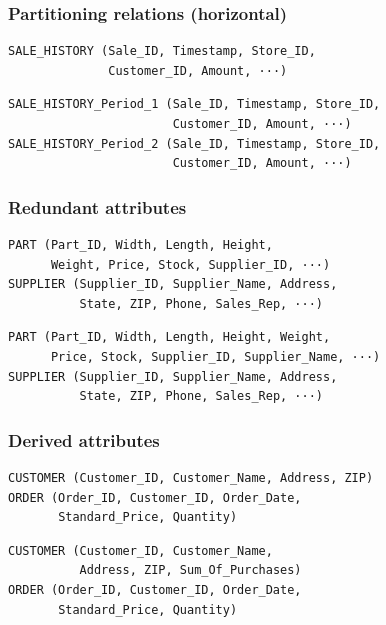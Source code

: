 \documentclass{beamer}
\begin{document}
\begin{frame}[fragile]
\frametitle{Partitioning relations (horizontal)}


\begin{verbatim}
SALE_HISTORY (Sale_ID, Timestamp, Store_ID,
              Customer_ID, Amount, ···)
\end{verbatim}

\vspace{\baselineskip}

\begin{verbatim}
SALE_HISTORY_Period_1 (Sale_ID, Timestamp, Store_ID,
                       Customer_ID, Amount, ···)
SALE_HISTORY_Period_2 (Sale_ID, Timestamp, Store_ID,
                       Customer_ID, Amount, ···)
\end{verbatim}

\end{frame}

\begin{frame}[fragile]
\frametitle{Redundant attributes}

\begin{verbatim}
PART (Part_ID, Width, Length, Height,
      Weight, Price, Stock, Supplier_ID, ···)
SUPPLIER (Supplier_ID, Supplier_Name, Address,
          State, ZIP, Phone, Sales_Rep, ···)
\end{verbatim}

\vspace{\baselineskip}

\begin{verbatim}
PART (Part_ID, Width, Length, Height, Weight,
      Price, Stock, Supplier_ID, Supplier_Name, ···)
SUPPLIER (Supplier_ID, Supplier_Name, Address,
          State, ZIP, Phone, Sales_Rep, ···)
\end{verbatim}

\end{frame}



\begin{frame}[fragile]
\frametitle{Derived attributes}

\begin{verbatim}
CUSTOMER (Customer_ID, Customer_Name, Address, ZIP)
ORDER (Order_ID, Customer_ID, Order_Date,
       Standard_Price, Quantity)
\end{verbatim}

\vspace{\baselineskip}

\begin{verbatim}
CUSTOMER (Customer_ID, Customer_Name,
          Address, ZIP, Sum_Of_Purchases)
ORDER (Order_ID, Customer_ID, Order_Date,
       Standard_Price, Quantity)
\end{verbatim}

\end{frame}
\end{document}
